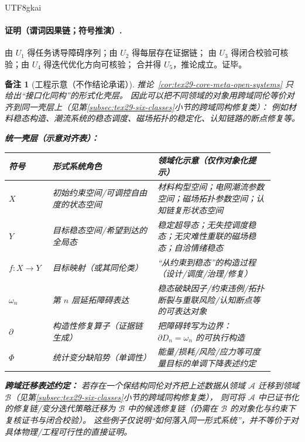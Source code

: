 \documentclass[12pt]{article}
\newtheorem{remark}{备注}[section]
\newcommand{\KouJing}{\texorpdfstring{表述约定}{表述约定}}
\begin{document}
\begin{CJK*}{UTF8}{gkai}
\paragraph{证明（谓词因果链；符号推演）.}
由 $U_1$ 得任务诱导障碍序列；由 $U_2$ 得每层存在证据链；
由 $U_3$ 得闭合校验可核验；由 $U_4$ 得迭代优化方向可核验；
合并得 $U_5$，推论成立。证毕。

\begin{remark}[工程示意（不作结论承诺）]
推论~\ref{cor:tex29-core-meta-open-systems} 只给出“接口化同构”的形式化壳层。
因此可以把不同领域的对象用跨域同伦等价对齐到同一壳层上（见第\ref{subsec:tex29-six-classes}小节的跨域同构修复类）：
例如材料稳态构造、潮流系统的稳态调度、磁场拓扑的稳定化、认知链路的断点修复等。

\medskip
\noindent\textbf{统一壳层（示意对齐表）：}
\begin{center}
\renewcommand{\arraystretch}{1.20}
\begin{tabular}{|p{0.14\linewidth}|p{0.36\linewidth}|p{0.40\linewidth}|}
\hline
\textbf{符号} & \textbf{形式系统角色} & \textbf{领域化示意（仅作对象化提示）} \\
\hline
$X$ & 初始约束空间/可调控自由度的状态空间 & 材料构型空间；电网潮流参数空间；磁场拓扑参数空间；认知链复形状态空间 \\
\hline
$Y$ & 目标稳态空间/希望到达的全局态 & 稳定超导态；无失控调度稳态；无灾难性重联的磁场稳态；自洽情绪稳态 \\
\hline
$f:X\to Y$ & 目标映射（或其同伦类） & “从约束到稳态”的构造过程（设计/调度/治理/修复） \\
\hline
$\omega_n$ & 第 $n$ 层延拓障碍表达 & 稳态破缺因子/约束违例/拓扑断裂与重联风险/认知断点等的可表达对象 \\
\hline
$\partial$ & 构造性修复算子（证据链生成） & 把障碍转写为边界：$\partial D_n=\omega_n$ 的可执行构造 \\
\hline
$\Phi$ & 统计变分缺陷势（单调性） & 能量/损耗/风险/应力等可度量目标的单调下降\KouJing \\
\hline
\end{tabular}
\end{center}

\noindent\textbf{跨域迁移\KouJing：}
若存在一个保结构同伦对齐把上述数据从领域 $\mathcal{A}$ 迁移到领域 $\mathcal{B}$（见第\ref{subsec:tex29-six-classes}小节的跨域同构修复类），
则可将 $\mathcal{A}$ 中已证书化的修复链/变分迭代策略迁移为 $\mathcal{B}$ 中的候选修复链（仍需在 $\mathcal{B}$ 的对象化与约束下复核证书与闭合校验）。
这些例子仅说明“如何落入同一形式系统”，并不等价于对具体物理/工程可行性的直接证明。
\end{remark}


\end{CJK*}
\end{document}
